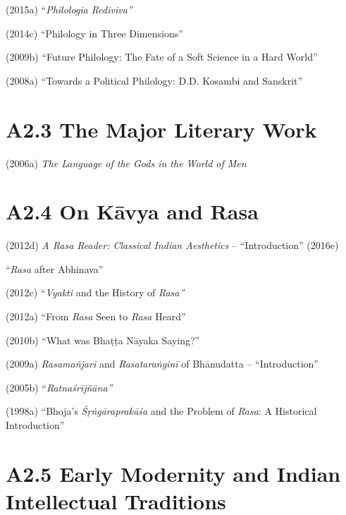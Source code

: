  \item (2015a) “\textit{Philologia Rediviva”}

 \item (2014c) “Philology in Three Dimensions”

 \item (2009b) “Future Philology: The Fate of a Soft Science in a Hard World”

 \item (2008a) “Towards a Political Philology: D.D. Kosambi and Sanskrit”



\section*{A2.3 The Major Literary Work}

(2006a) \textit{The Language of the Gods in the World of Men}


\section*{A2.4 On Kāvya and Rasa}

\item (2012d) \textit{A Rasa Reader: Classical Indian Aesthetics} – “Introduction” (2016e)

 \item “\textit{Rasa} after Abhinava”

 \item (2012c) “\textit{Vyakti} and the History of \textit{Rasa”}

 \item (2012a) “From \textit{Rasa} Seen to \textit{Rasa} Heard”

 \item (2010b) “What was Bhaṭṭa Nāyaka Saying?”

 \item (2009a) \textit{Rasamañjarī} and \textit{Rasataraṅginī} of Bhānudatta – “Introduction”

 \item (2005b) “\textit{Ratnaśrījñāna”}

 \item (1998a) “Bhoja's \textit{Śṛṅgāraprakāśa} and the Problem of \textit{Rasa}: A Historical Introduction”



\section*{A2.5 Early Modernity and Indian Intellectual Traditions}

